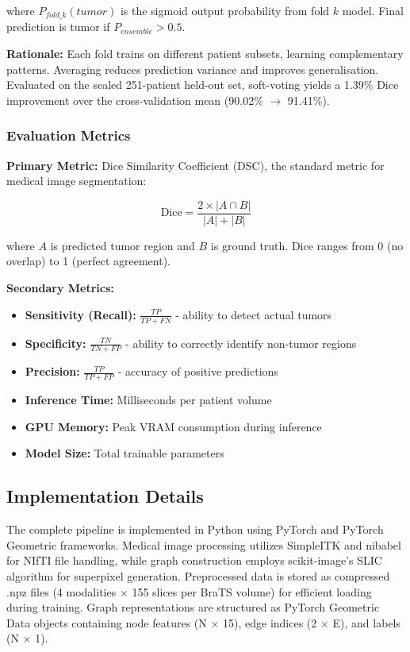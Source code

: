 where $P_{fold\_k}(tumor)$ is the sigmoid output probability from fold $k$ model. Final prediction is tumor if $P_{ensemble} > 0.5$.

\textbf{Rationale:} Each fold trains on different patient subsets, learning complementary patterns. Averaging reduces prediction variance and improves generalisation. Evaluated on the sealed 251-patient held-out set, soft-voting yields a 1.39\% Dice improvement over the cross-validation mean (90.02\% $\rightarrow$ 91.41\%).

\subsubsection{Evaluation Metrics}

\textbf{Primary Metric:} Dice Similarity Coefficient (DSC), the standard metric for medical image segmentation:

\begin{equation}
\text{Dice} = \frac{2 \times |A \cap B|}{|A| + |B|}
\end{equation}

where $A$ is predicted tumor region and $B$ is ground truth. Dice ranges from 0 (no overlap) to 1 (perfect agreement).

\textbf{Secondary Metrics:}
\begin{itemize}
    \item \textbf{Sensitivity (Recall):} $\frac{TP}{TP + FN}$ - ability to detect actual tumors
    \item \textbf{Specificity:} $\frac{TN}{TN + FP}$ - ability to correctly identify non-tumor regions
    \item \textbf{Precision:} $\frac{TP}{TP + FP}$ - accuracy of positive predictions
    \item \textbf{Inference Time:} Milliseconds per patient volume
    \item \textbf{GPU Memory:} Peak VRAM consumption during inference
    \item \textbf{Model Size:} Total trainable parameters
\end{itemize}


\subsection{Implementation Details}

The complete pipeline is implemented in Python using PyTorch and PyTorch Geometric frameworks. Medical image processing utilizes SimpleITK and nibabel for NIfTI file handling, while graph construction employs scikit-image's SLIC algorithm for superpixel generation. Preprocessed data is stored as compressed .npz files (4 modalities $\times$ 155 slices per BraTS volume) for efficient loading during training. Graph representations are structured as PyTorch Geometric Data objects containing node features (N $\times$ 15), edge indices (2 $\times$ E), and labels (N $\times$ 1).

